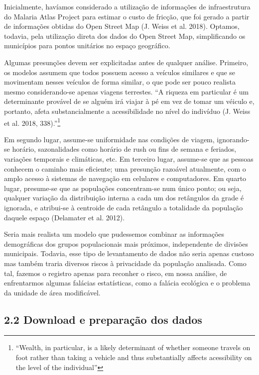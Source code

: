 \documentclass[]{article}
\let\rmarkdownfootnote\footnote%
\def\footnote{\protect\rmarkdownfootnote}
\begin{document}
Inicialmente, havíamos considerado a utilização de informações de
infraestrutura do Malaria Atlas Project para estimar o custo de fricção,
que foi gerado a partir de informações obtidas do Open Street Map (J.
Weiss et al. 2018). Optamos, todavia, pela utilização direta dos dados
do Open Street Map, simplificando os municípios para pontos unitários no
espaço geográfico.

Algumas presunções devem ser explicitadas antes de qualquer análise.
Primeiro, os modelos assumem que todos possuem acesso a veículos
similares e que se movimentam nesses veículos de forma similar, o que
pode ser pouco realista mesmo considerando-se apenas viagens terrestes.
``A riqueza em particular é um determinante provável de se alguém irá
viajar à pé em vez de tomar um véiculo e, portanto, afeta
substancialmente a acessibilidade no nível do indivíduo (J. Weiss et al.
2018, 338).''\footnote{``Wealth, in particular, is a likely determinant
  of whether someone travels on foot rather than taking a vehicle and
  thus substantially affects acessibility on the level of the
  individual''}

Em segundo lugar, assume-se uniformidade nas condições de viagem,
ignorando-se horário, sazonalidades como horário de rush ou fins de
semana e feriados, variações temporais e climáticas, etc. Em terceiro
lugar, assume-se que as pessoas conhecem o caminho mais eficiente; uma
presunção razoável atualmente, com o amplo acesso à sistemas de
navegação em celulares e computadores. Em quarto lugar, presume-se que
as populações concentram-se num único ponto; ou seja, qualquer variação
da distribuição interna a cada um dos retângulos da grade é ignorada, e
atribui-se à centroide de cada retângulo a totalidade da população
daquele espaço (Delamater et al. 2012).

Seria mais realista um modelo que pudessemos combinar as informações
demográficas dos grupos populacionais mais próximos, independente de
divisões municipais. Todavia, esse tipo de levantamento de dados não
seria apenas custoso mas também traria diversos riscos à privacidade da
população analisada. Como tal, fazemos o registro apenas para reconher o
risco, em nossa análise, de enfrentarmos algumas falácias estatísticas,
como a falácia ecológica e o problema da unidade de área modificável.

\hypertarget{download-e-preparacao-dos-dados}{%
\subsection{2.2 Download e preparação dos
dados}\label{download-e-preparacao-dos-dados}}
\end{document}
